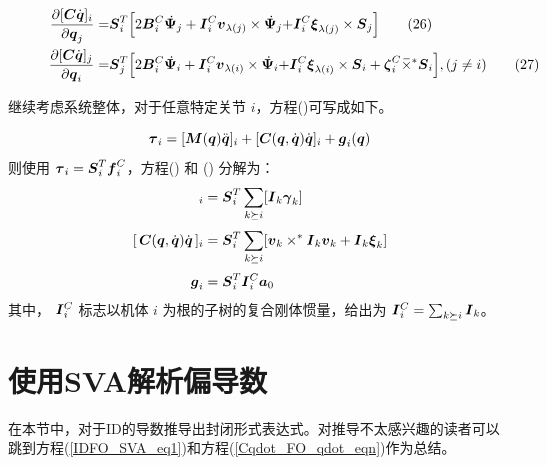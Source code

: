 \documentclass[letterpaper, 10 pt, conference]{ieeetran}  %
\begin{document}
\begin{figure}[!b]
\hrulefill
\begin{align}
     \frac{\partial [\C\qd]_{i}}{\partial \red{\q_{j}}} = & \red{\Phibar_{i}^{T}  \Big[  2 \B_{i}^{C} \Psibardot_{j}  +     \I_{i}^{C} \v_{\lambda(j)}  \times \Psibardot_{j}   + } 
 \red{\I_{i}^{C} \xibar_{\lambda(j)} \times \Phibar_{j}  \Big] } 
     \label{CFO_q_eqn_1}
 \tag{26}\\
     \frac{\partial [\C\qd]_{j}}{\partial \red{\q_{i}}} = & \red{\Phibar_{j}^{T}  \Big[  2 \B_{i}^{C} \Psibardot_{i}  +     \I_{i}^{C} \v_{\lambda(i)} \times \Psibardot_{i} +}
     \red{\I_{i}^{C} \xibar_{\lambda(i)} \times \Phibar_{i}  + \zetabar_{i}^{C} \crff \Phibar_{i} \Big] , (j \neq i) }
    \label{CFO_q_eqn_2}
    \tag{27}
\end{align}
\end{figure}


继续考虑系统整体，对于任意特定关节 $i$，方程(\red{\ref{inv_dyn}})可写成如下。

\begin{equation}
    \red{\taubar_{i}} =   [ \M(\q) \qdd]_{i}+   [\C(\q,\qd) \qd]_{i}  + \red{\g_{i}}(\q)
    \label{inv_dyn_expanded_eq2}
\end{equation}
%
则使用 ${\color{black}\boldsymbol{\tau}_{i}}=\boldsymbol{S}_{i}^{T}\boldsymbol{f}_{i}^{C} $，方程(\red{\ref{spatial_acc}}) 和 (\red{\ref{inv_dyn_expanded_eq2}}) 分解为： %
\begin{align}
 [\, \M(\q) \qdd \,]_{i} &= \red{\Phibar_{i}^{T}} \sum_{k \succeq i} [\I_{k} \gammabar_{k}]  
\label{mqdotdot_exp_2}\\[.5ex]
   [\,\C(\q,\qd) \qd\,]_{i} &= \red{\Phibar_{i}^{T}} \sum_{k \succeq i}[ \v_{k} \times^* \I_{k} \v_{k} + \I_{k}  \xibar_{k} ]
    \label{cqdot_exp_2}\\[.5ex]
    \red{\g_{i}} &=
   \red{ \Phibar_{i}^{T} \I_{i}^C  \a_{0}}
   \label{g_eqn}
\end{align}
其中， $\boldsymbol{I}{}{}_{i}^C$ 标志以机体 $i$ 为根的子树的复合刚体惯量，给出为 $\boldsymbol{I}{}{}_{i}^{C} = \sum_{k \succeq i} \boldsymbol{I}{}_{k}$。


\section{使用SVA解析偏导数}
\label{sec:fdsva}

在本节中，对于ID的导数推导出封闭形式表达式。对推导不太感兴趣的读者可以跳到方程(\ref{IDFO_SVA_eq1})和方程(\ref{Cqdot_FO_qdot_eqn})作为总结。
\end{document}
